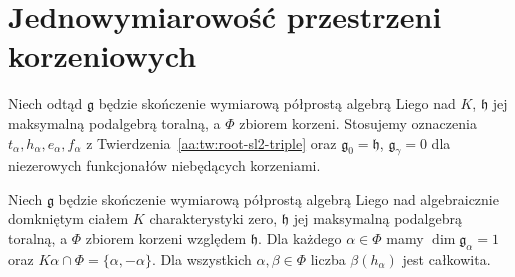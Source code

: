 \section{Jednowymiarowość przestrzeni korzeniowych}
Niech odtąd $\mathfrak g$ będzie skończenie wymiarową półprostą algebrą Liego nad $K$, $\mathfrak h$ jej maksymalną podalgebrą toralną, a $\Phi$ zbiorem korzeni. Stosujemy oznaczenia $t_\alpha,h_\alpha,e_\alpha,f_\alpha$ z Twierdzenia~\ref{aa:tw:root-sl2-triple} oraz $\mathfrak g_0=\mathfrak h$, $\mathfrak g_\gamma=0$ dla niezerowych funkcjonałów niebędących korzeniami.

\begin{twierdzenie}
\label{aa:tw:root-dim-reduced}
Niech $\mathfrak g$ będzie skończenie wymiarową półprostą algebrą Liego nad algebraicznie domkniętym ciałem $K$ charakterystyki zero, $\mathfrak h$ jej maksymalną podalgebrą toralną, a $\Phi$ zbiorem korzeni względem $\mathfrak h$. Dla każdego $\alpha\in\Phi$ mamy $\dim\mathfrak g_\alpha=1$ oraz $K\alpha\cap\Phi=\{\alpha,-\alpha\}$. Dla wszystkich $\alpha,\beta\in\Phi$ liczba $\beta(h_\alpha)$ jest całkowita.
\end{twierdzenie}
